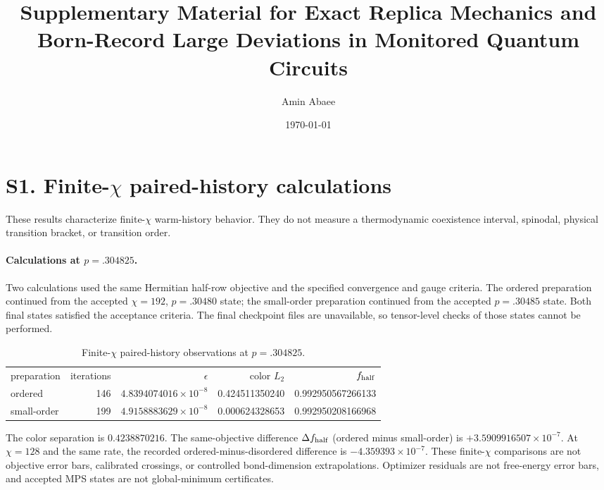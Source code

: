 \documentclass[aps,prx,onecolumn,nofootinbib]{revtex4-2}
\begin{document}
\title{Supplementary Material for Exact Replica Mechanics and Born-Record Large Deviations in Monitored Quantum Circuits}
\author{Amin Abaee}
\date{\today}
\maketitle

\section*{S1. Finite-$\chi$ paired-history calculations}
\label{sec:supp-chi192}

These results characterize finite-$\chi$ warm-history behavior. They do not measure a thermodynamic coexistence interval, spinodal, physical transition bracket, or transition order.

\paragraph{Calculations at $p=.304825$.} Two calculations used the same Hermitian half-row objective and the specified convergence and gauge criteria. The ordered preparation continued from the accepted $\chi=192$, $p=.30480$ state; the small-order preparation continued from the accepted $p=.30485$ state. Both final states satisfied the acceptance criteria. The final checkpoint files are unavailable, so tensor-level checks of those states cannot be performed.

\begin{table}[h]
\caption{Finite-$\chi$ paired-history observations at $p=.304825$.}
\begin{ruledtabular}
\begin{tabular}{lrrrr}
preparation & iterations & $\epsilon$ & color $L_2$ & $f_{\rm half}$\\
\colrule
ordered & 146 & $4.8394074016\times10^{-8}$ & 0.424511350240 & 0.992950567266133\\
small-order & 199 & $4.9158883629\times10^{-8}$ & 0.000624328653 & 0.992950208166968\\
\end{tabular}
\end{ruledtabular}
\end{table}

The color separation is $0.4238870216$. The same-objective difference $\Delta f_{\rm half}$ (ordered minus small-order) is $+3.5909916507\times10^{-7}$. At $\chi=128$ and the same rate, the recorded ordered-minus-disordered difference is $-4.359393\times10^{-7}$. These finite-$\chi$ comparisons are not objective error bars, calibrated crossings, or controlled bond-dimension extrapolations. Optimizer residuals are not free-energy error bars, and accepted MPS states are not global-minimum certificates.
\end{document}
